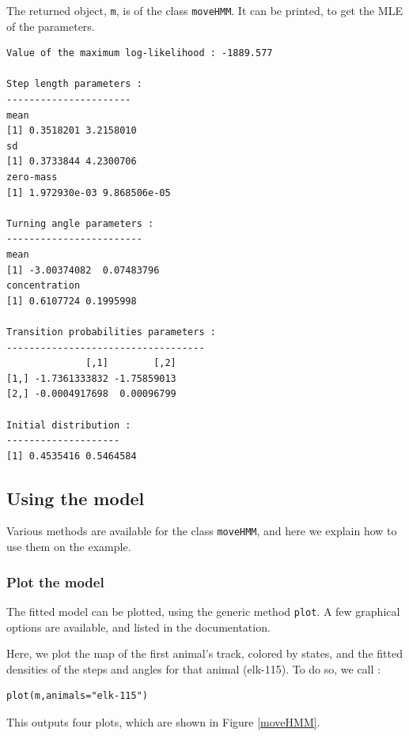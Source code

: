 \documentclass[]{article}
\begin{document}
The returned object, \texttt{m}, is of the class \texttt{moveHMM}. It can be printed, to get the MLE of the parameters.

\begin{lstlisting}
Value of the maximum log-likelihood : -1889.577 

Step length parameters :
----------------------
mean 
[1] 0.3518201 3.2158010
sd 
[1] 0.3733844 4.2300706
zero-mass 
[1] 1.972930e-03 9.868506e-05

Turning angle parameters :
------------------------
mean 
[1] -3.00374082  0.07483796
concentration 
[1] 0.6107724 0.1995998

Transition probabilities parameters :
-----------------------------------
              [,1]        [,2]
[1,] -1.7361333832 -1.75859013
[2,] -0.0004917698  0.00096799

Initial distribution :
--------------------
[1] 0.4535416 0.5464584
\end{lstlisting}

\subsection{Using the model}
Various methods are available for the class \texttt{moveHMM}, and here we explain how to use them on the example.

\subsubsection{Plot the model}
The fitted model can be plotted, using the generic method \texttt{plot}. A few graphical options are available, and listed in the documentation.

Here, we plot the map of the first animal's track, colored by states, and the fitted densities of the steps and angles for that animal (elk-115). To do so, we call :

\begin{lstlisting}
plot(m,animals="elk-115")
\end{lstlisting}

\noindent This outputs four plots, which are shown in Figure \ref{moveHMM}.\\
\end{document}
